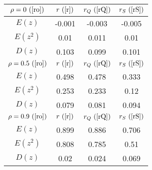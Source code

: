 \begin{tabular}{|c|c|c|c|}
\hline
$\rho = 0~(\ref{ro})$ & $r ~(\ref{r})$ & $r_Q ~(\ref{rQ})$ & $r_S ~(\ref{rS})$\\
\hline
$E(z)$ & -0.001 & -0.003 & -0.005\\
\hline
$E(z^2)$ & 0.01 & 0.011 & 0.01\\
\hline
$D(z)$ & 0.103 & 0.099 & 0.101\\
\hline
$\rho = 0.5~(\ref{ro})$ & $r ~(\ref{r})$ & $r_Q ~(\ref{rQ})$ & $r_S ~(\ref{rS})$\\
\hline
$E(z)$ & 0.498 & 0.478 & 0.333\\
\hline
$E(z^2)$ & 0.253 & 0.233 & 0.12\\
\hline
$D(z)$ & 0.079 & 0.081 & 0.094\\
\hline
$\rho = 0.9~(\ref{ro})$ & $r ~(\ref{r})$ & $r_Q ~(\ref{rQ})$ & $r_S ~(\ref{rS})$\\
\hline
$E(z)$ & 0.899 & 0.886 & 0.706\\
\hline
$E(z^2)$ & 0.808 & 0.785 & 0.51\\
\hline
$D(z)$ & 0.02 & 0.024 & 0.069\\
\hline
\end{tabular}